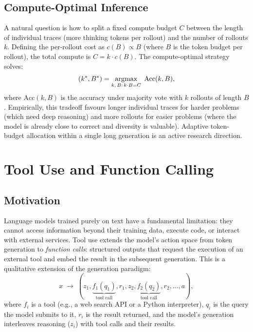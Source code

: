 \subsection{Compute-Optimal Inference}
\label{subsec:compute-optimal}

A natural question is how to split a fixed compute budget $C$ between
the length of individual traces (more thinking tokens per rollout)
and the number of rollouts $k$. Defining the per-rollout cost as
$c(B) \propto B$ (where $B$ is the token budget per rollout), the
total compute is $C = k \cdot c(B)$. The compute-optimal strategy
solves:
\[
(k^*, B^*) = \operatorname*{argmax}_{k,\,B:\,k\cdot B = C}\; \text{Acc}(k, B),
\]
where $\text{Acc}(k, B)$ is the accuracy under majority vote with $k$
rollouts of length $B$. Empirically, this tradeoff favours longer
individual traces for harder problems (which need deep reasoning) and
more rollouts for easier problems (where the model is already close
to correct and diversity is valuable). Adaptive token-budget allocation
within a single long generation is an active research direction.

\section{Tool Use and Function Calling}
\label{sec:tool-use}

\subsection{Motivation}

Language models trained purely on text have a fundamental limitation:
they cannot access information beyond their training data, execute
code, or interact with external services. Tool use
extends the model's action space from token generation to
\emph{function calls}: structured outputs that request the execution
of an external tool and embed the result in the subsequent generation.
This is a qualitative extension of the generation paradigm:
\begin{equation}
\label{eq:tool-loop}
x \;\longrightarrow\; (z_1, \underbrace{f_1(q_1)}_{\text{tool call}},
r_1, z_2, \underbrace{f_2(q_2)}_{\text{tool call}}, r_2, \ldots, a),
\end{equation}
where $f_i$ is a tool (e.g., a web search API or a Python interpreter),
$q_i$ is the query the model submits to it, $r_i$ is the result
returned, and the model's generation interleaves reasoning ($z_i$)
with tool calls and their results.

